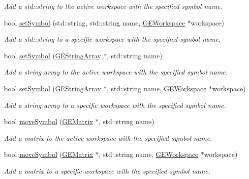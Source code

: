 \begin{DoxyCompactItemize}
\begin{DoxyCompactList}\small\item\em Add a std\+::string to the active workspace with the specified symbol name. \end{DoxyCompactList}\item 
bool \hyperlink{class_g_a_u_s_s_a7bf4d629d539c1cba827ec59220b4659}{set\+Symbol} (std\+::string, std\+::string name, \hyperlink{class_g_e_workspace}{G\+E\+Workspace} $\ast$workspace)
\begin{DoxyCompactList}\small\item\em Add a std\+::string to a specific workspace with the specified symbol name. \end{DoxyCompactList}\item 
bool \hyperlink{class_g_a_u_s_s_ac73f4a999e796eccb2728f1f914baff6}{set\+Symbol} (\hyperlink{class_g_e_string_array}{G\+E\+String\+Array} $\ast$, std\+::string name)
\begin{DoxyCompactList}\small\item\em Add a string array to the active workspace with the specified symbol name. \end{DoxyCompactList}\item 
bool \hyperlink{class_g_a_u_s_s_a608f4d41dbb4dd9fe839732bf5412043}{set\+Symbol} (\hyperlink{class_g_e_string_array}{G\+E\+String\+Array} $\ast$, std\+::string name, \hyperlink{class_g_e_workspace}{G\+E\+Workspace} $\ast$workspace)
\begin{DoxyCompactList}\small\item\em Add a string array to a specific workspace with the specified symbol name. \end{DoxyCompactList}\item 
bool \hyperlink{class_g_a_u_s_s_a6301062a26bd78f37893318e5618f6cb}{move\+Symbol} (\hyperlink{class_g_e_matrix}{G\+E\+Matrix} $\ast$, std\+::string name)
\begin{DoxyCompactList}\small\item\em Add a matrix to the active workspace with the specified symbol name. \end{DoxyCompactList}\item 
bool \hyperlink{class_g_a_u_s_s_ad2061e878f99b3536b1b832f421e2327}{move\+Symbol} (\hyperlink{class_g_e_matrix}{G\+E\+Matrix} $\ast$, std\+::string name, \hyperlink{class_g_e_workspace}{G\+E\+Workspace} $\ast$workspace)
\begin{DoxyCompactList}\small\item\em Add a matrix to a specific workspace with the specified symbol name. \end{DoxyCompactList}\item 

\end{DoxyCompactItemize}
